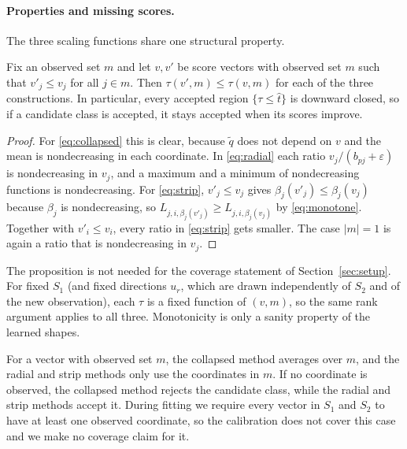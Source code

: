 
\paragraph{Properties and missing scores.} The three scaling functions share one structural property.

\begin{proposition}\label{prop:monotone}
Fix an observed set $m$ and let $v,v'$ be score vectors with observed set $m$ such that $v'_j\le v_j$ for all $j\in m$. Then 
$\tau(v',m)\le\tau(v,m)$ for each of the three constructions. In particular, every accepted region $\{\tau\le\hat t\}$ is downward 
closed, so if a candidate class is accepted, it stays accepted when its scores improve.
\end{proposition}

\begin{proof}
For \eqref{eq:collapsed} this is clear, because $\tilde q$ does not depend on $v$ and the mean is nondecreasing in each coordinate. 
In \eqref{eq:radial} each ratio $v_j/(b_{pj}+\varepsilon)$ is nondecreasing in $v_j$, and a maximum and a minimum of nondecreasing 
functions is nondecreasing. For \eqref{eq:strip}, $v'_j\le v_j$ gives $\beta_j(v'_j)\le\beta_j(v_j)$ because $\beta_j$ is 
nondecreasing, so $L_{j,i,\beta_j(v'_j)} \ge L_{j,i,\beta_j(v_j)}$ by \eqref{eq:monotone}. Together with $v'_i\le v_i$, every ratio 
in \eqref{eq:strip} gets smaller. The case $|m|=1$ is again a ratio that is nondecreasing in $v_j$.
\end{proof}

The proposition is not needed for the coverage statement of Section~\ref{sec:setup}. For fixed $S_1$ (and fixed directions $u_r$, 
which are drawn independently of $S_2$ and of the new observation), each $\tau$ is a fixed function of $(v,m)$, so the same rank 
argument applies to all three. Monotonicity is only a sanity property of the learned shapes.

For a vector with observed set $m$, the collapsed method averages over $m$, and the radial and strip methods only use the 
coordinates in $m$. If no coordinate is observed, the collapsed method rejects the candidate class, while the radial and strip 
methods accept it. During fitting we require every vector in $S_1$ and $S_2$ to have at least one observed coordinate, so the 
calibration does not cover this case and we make no coverage claim for it.